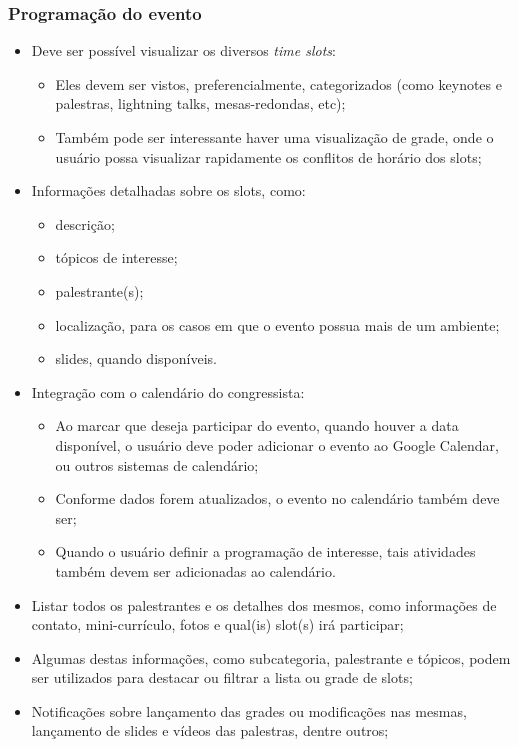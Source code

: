 \documentclass[12pt,a4paper,twoside,hyphens,english,brazil]{abntex2}
\begin{document}
\subsubsection*{Programação do evento}
\begin{itemize}
	\item Deve ser possível visualizar os diversos \emph{time slots}:
		\begin{itemize}
			\item Eles devem ser vistos, preferencialmente, categorizados (como keynotes e palestras, lightning talks, mesas-redondas, etc);
			\item Também pode ser interessante haver uma visualização de grade, onde o usuário possa visualizar rapidamente os conflitos de horário dos slots;
		\end{itemize}
	\item Informações detalhadas sobre os slots, como:
		\begin{itemize}
			\item descrição;
			\item tópicos de interesse;
			\item palestrante(s);
			\item localização, para os casos em que o evento possua mais de um ambiente;
			\item slides, quando disponíveis.
		\end{itemize}
	\item Integração com o calendário do congressista:
		\begin{itemize}
			\item Ao marcar que deseja participar do evento, quando houver a data disponível, o usuário deve poder adicionar o evento ao Google Calendar, ou outros sistemas de calendário;
			\item Conforme dados forem atualizados, o evento no calendário também deve ser;
			\item Quando o usuário definir a programação de interesse, tais atividades também devem ser adicionadas ao calendário.
		\end{itemize}
	\item Listar todos os palestrantes e os detalhes dos mesmos, como informações de contato, mini-currículo, fotos e qual(is) slot(s) irá participar;
	\item Algumas destas informações, como subcategoria, palestrante e tópicos, podem ser utilizados para destacar ou filtrar a lista ou grade de slots;
	\item Notificações sobre lançamento das grades ou modificações nas mesmas, lançamento de slides e vídeos das palestras, dentre outros;
\end{itemize}
\end{document}
